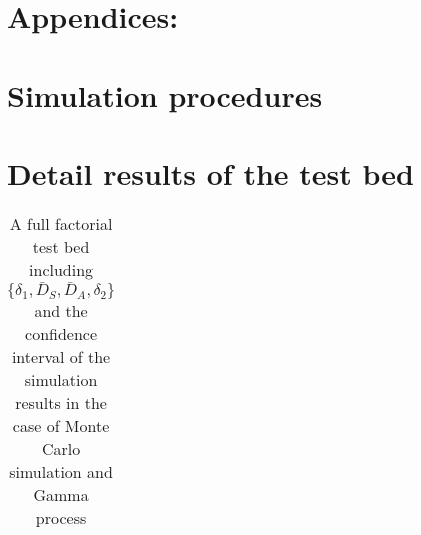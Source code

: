 \documentclass[preprint,12pt]{elsarticle}
\begin{document}
\section{Appendices:}
\appendix
\section{Simulation procedures}
\section{Detail results of the test bed}

\begin{table} [h]
\caption{A full factorial test bed including $\{\delta_{1}, \bar{D}_{S}, \bar{D}_{A}, \delta_{2}\}$ and the confidence interval of the simulation results in the case of Monte Carlo simulation and Gamma process}
\begin{tabular}{|l|c c|}


\end{tabular}
\end{table}
\end{document}
